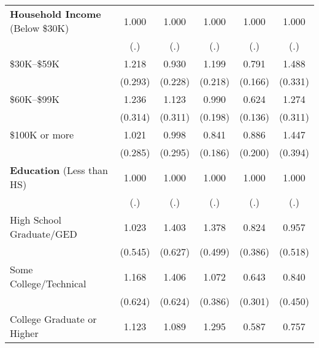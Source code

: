 \begin{table}[htbp]
\begin{tabular}{l*{5}{c}}
\textbf{Household Income} (Below \$30K)&       1.000         &       1.000         &       1.000         &       1.000         &       1.000         \\
                    &         (.)         &         (.)         &         (.)         &         (.)         &         (.)         \\
\$30K--\$59K        &       1.218         &       0.930         &       1.199         &       0.791         &       1.488\sym{*}  \\
                    &     (0.293)         &     (0.228)         &     (0.218)         &     (0.166)         &     (0.331)         \\
\$60K--\$99K        &       1.236         &       1.123         &       0.990         &       0.624\sym{**} &       1.274         \\
                    &     (0.314)         &     (0.311)         &     (0.198)         &     (0.136)         &     (0.311)         \\
\$100K or more      &       1.021         &       0.998         &       0.841         &       0.886         &       1.447         \\
                    &     (0.285)         &     (0.295)         &     (0.186)         &     (0.200)         &     (0.394)         \\
\textbf{Education} (Less than HS)&       1.000         &       1.000         &       1.000         &       1.000         &       1.000         \\
                    &         (.)         &         (.)         &         (.)         &         (.)         &         (.)         \\
High School Graduate/GED&       1.023         &       1.403         &       1.378         &       0.824         &       0.957         \\
                    &     (0.545)         &     (0.627)         &     (0.499)         &     (0.386)         &     (0.518)         \\
Some College/Technical&       1.168         &       1.406         &       1.072         &       0.643         &       0.840         \\
                    &     (0.624)         &     (0.624)         &     (0.386)         &     (0.301)         &     (0.450)         \\
College Graduate or Higher&       1.123         &       1.089         &       1.295         &       0.587         &       0.757         \\

\end{tabular}
\end{table}
